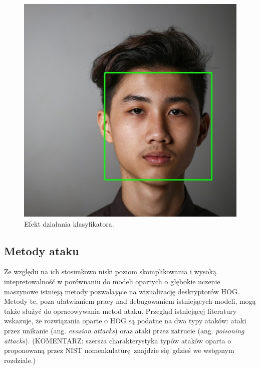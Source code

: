 \documentclass[12pt,a4paper,leqno,oneside,titlepage]{book}
\begin{document}
\begin{figure}[!tbp]
\begin{minipage}[b]{0.4\textwidth}
    \includegraphics[width=\textwidth]{pictures/face_detected.jpg}
    \caption{Efekt działania klasyfikatora.}
  \end{minipage}
\end{figure}

\subsection{Metody ataku}
Ze względu na ich stosunkowo niski poziom skomplikowania i wysoką intepretowalność w porównaniu do modeli opartych o głębokie uczenie maszynowe istnieją metody pozwalające na wizualizację deskryptorów HOG. Metody te, poza ułatwianiem pracy nad debugowaniem istniejących modeli, mogą także służyć do opracowywania metod ataku. Przegląd istniejącej literatury wskazuje, że rozwiązania oparte o HOG są podatne na dwa typy ataków: ataki przez unikanie (ang. \textit{evasion attacks}) oraz ataki przez zatrucie (ang. \textit{poisoning attacks})\cite{Hoggles, MacDonald19}. (KOMENTARZ: szersza charakterystyka typów ataków oparta o proponowaną przez NIST nomenkulaturę znajdzie się gdzieś we wstępnym rozdziale.)
\end{document}
